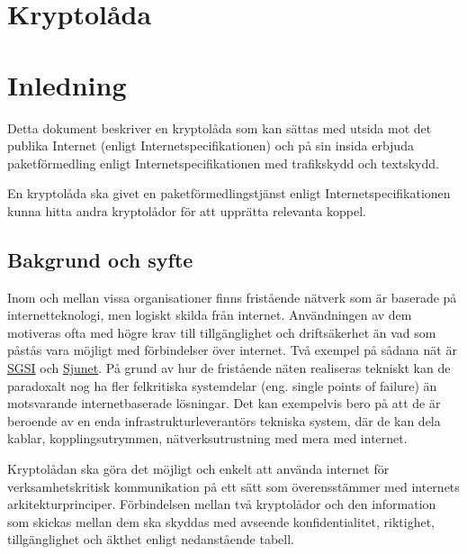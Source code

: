 \documentclass[12pt,a4paper]{article}
\begin{document}
\section*{Kryptolåda}



\section{Inledning}\label{inledning}

Detta dokument beskriver en kryptolåda som kan sättas med utsida mot det
publika Internet (enligt Internetspecifikationen) och på sin insida
erbjuda paketförmedling enligt Internetspecifikationen med trafikskydd
och textskydd.

En kryptolåda ska givet en paketförmedlingstjänst enligt
Internetspecifikationen kunna hitta andra kryptolådor för att upprätta
relevanta koppel.

\subsection{Bakgrund och syfte}\label{bakgrund-och-syfte}

Inom och mellan vissa organisationer finns fristående nätverk som är
baserade på internetteknologi, men logiskt skilda från internet.
Användningen av dem motiveras ofta med högre krav till tillgänglighet
och driftsäkerhet än vad som påstås vara möjligt med förbindelser över
internet. Två exempel på sådana nät är
\href{https://www.msb.se/sv/verktyg--tjanster/sgsi/}{SGSI} och
\href{https://www.inera.se/tjanster/alla-tjanster-a-o/sjunet/}{Sjunet}.
På grund av hur de fristående näten realiseras tekniskt kan de
paradoxalt nog ha fler felkritiska systemdelar (eng. single points of
failure) än motsvarande internetbaserade lösningar. Det kan exempelvis
bero på att de är beroende av en enda infrastrukturleverantörs tekniska
system, där de kan dela kablar, kopplingsutrymmen, nätverksutrustning
med mera med internet.

Kryptolådan ska göra det möjligt och enkelt att använda internet för
verksamhetskritisk kommunikation på ett sätt som överensstämmer med
internets arkitekturprinciper. Förbindelsen mellan två kryptolådor och
den information som skickas mellan dem ska skyddas med avseende
konfidentialitet, riktighet, tillgänglighet och äkthet enligt
nedanstående tabell.
\end{document}
